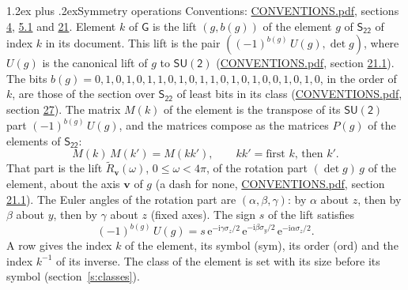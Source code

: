 \documentclass[10pt,a4paper]{article}
\makeatletter
\renewcommand\section{\@startsection{section}{1}{\z@}{-3ex plus -1ex minus -.2ex}%
  {1.2ex plus .2ex}{\normalfont\large\sffamily\bfseries\color{parttitle}}}
\numberwithin{equation}{section}
\newcommand{\grp}[1]{\mathsf{#1}}
\newcommand{\vv}{\mathbf{v}}
\newcommand{\iunit}{\mathrm{i}}
\newcommand{\expe}{\mathrm{e}}
\newcommand{\lift}[1]{\tilde{#1}}
\newcommand{\pauli}[1]{\sigma_{#1}}
\makeatother
\begin{document}
\section{Symmetry operations}\label{s:elements}
Conventions: \href{../../CONVENTIONS.pdf}{CONVENTIONS.pdf}, sections \href{../../../rotation/CONVENTIONS.pdf\#conv.4}{4}, \href{../../../rotation/CONVENTIONS.pdf\#conv.5.1}{5.1} and \href{../../CONVENTIONS.pdf\#conv.21}{21}.
\leavevmode\label{n:index.element}\label{n:element.g}\label{n:function.section}Element $k$ of $\grp{G}$ is the lift $(g, b(g))$ of the element $g$ of \href{../../../rotation/data/pdf/S22.pdf}{$\grp{S_{22}}$} of index $k$ in its document. This lift is the pair $((-1)^{b(g)}\,U(g), \det g)$, where $U(g)$ is the canonical lift of $g$ to $\grp{SU(2)}$ (\href{../../CONVENTIONS.pdf}{CONVENTIONS.pdf}, section \href{../../CONVENTIONS.pdf\#conv.21.1}{21.1}). The bits $b(g) = 0, 1, 0, 1, 0, 1, 1, 0, 1, 0, 1, 1, 0, 1, 0, 1, 0, 0, 1, 0, 1, 0$, in the order of $k$, are those of the section over $\grp{S_{22}}$ of least bits in its class (\href{../../CONVENTIONS.pdf}{CONVENTIONS.pdf}, section \href{../../CONVENTIONS.pdf\#conv.27}{27}). \label{n:matrix.element.pin}\label{n:matrix.element}The matrix $M(k)$ of the element is the transpose of its $\grp{SU(2)}$ part $(-1)^{b(g)}\,U(g)$, and the matrices compose as the matrices $P(g)$ of the elements of $\grp{S_{22}}$:
\begin{equation}\label{e:mprod}M(k)\,M(k') = M(kk'),\qquad kk' = \text{first } k\text{, then } k'.\end{equation}
\leavevmode\label{n:angle.omega}\label{n:vector.axis}\label{n:vector.pole}That part is the lift $\lift{R}_{\vv}(\omega)$, $0 \le \omega < 4\pi$, of the rotation part $(\det g)\,g$ of the element, about the axis $\vv$ of $g$ (a dash for none, \href{../../CONVENTIONS.pdf}{CONVENTIONS.pdf}, section \href{../../CONVENTIONS.pdf\#conv.21.1}{21.1}). \label{n:angle.euler.alpha}\label{n:angle.euler.beta}\label{n:angle.euler.gamma}\label{n:vector.coordinates}The Euler angles of the rotation part are $(\alpha,\beta,\gamma)$: by $\alpha$ about $z$, then by $\beta$ about $y$, then by $\gamma$ about $z$ (fixed axes). \label{n:local.euler.sign}The sign $s$ of the lift satisfies
\begin{equation}\label{e:euler}(-1)^{b(g)}\,U(g) = s\,\expe^{-\iunit\gamma\pauli{z}/2}\,\expe^{-\iunit\beta\pauli{y}/2}\,\expe^{-\iunit\alpha\pauli{z}/2}.\end{equation}
\leavevmode\label{n:index.element.inverse}\label{n:head.sym}\label{n:head.ord}A row gives the index $k$ of the element, its symbol (sym), its order (ord) and the index $k^{-1}$ of its inverse. \label{n:head.class}The class of the element is set with its size before its symbol (section~\ref{s:classes}).
\end{document}

